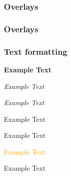\documentclass{beamer}
\begin{document}
\begin{frame}
	\frametitle{Overlays}
	
	
\end{frame}

\begin{frame}
	\frametitle{Overlays}
	
	
\end{frame}


\begin{frame}
	\frametitle{Text formatting}
	\textbf<2>{Example Text}
	
	\textit<2>{Example Text}
	
	\textsl<2>{Example Text}
	
	\textrm<2>{Example Text}
	
	\textsf<2>{Example Text}
	
	\textcolor<2>{orange}{Example Text}
	
	\alert<2>{Example Text}
	
\end{frame}


\end{document}

